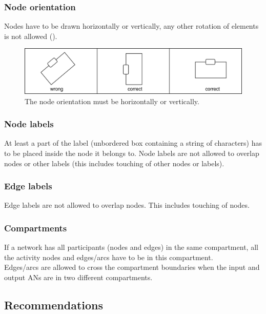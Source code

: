 \subsubsection{Node orientation}

Nodes have to be drawn horizontally or vertically, any other rotation of elements is not allowed ().

\begin{figure}[!ht]
  \centering
  \includegraphics[scale=0.4]{images/layout-orientation}
  \caption{The node orientation must be horizontally or vertically.}\label{fig:af:layout5}
\end{figure}

\subsubsection{Node labels}

At least a part of the label (unbordered box containing a string of characters) has to be placed inside the node it belongs to. Node labels are not allowed to overlap nodes or other labels (this includes touching of other nodes or labels).

\subsubsection{Edge labels}

Edge labels are not allowed to overlap nodes. This includes touching of nodes.

\subsubsection{Compartments}

If a network has all participants (nodes and edges) in the same compartment, all the activity nodes and edges/arcs have to be in this compartment.  \\
Edges/arcs are allowed to cross the compartment boundaries when the input and output ANs are in two different compartments.

\subsection{Recommendations}

